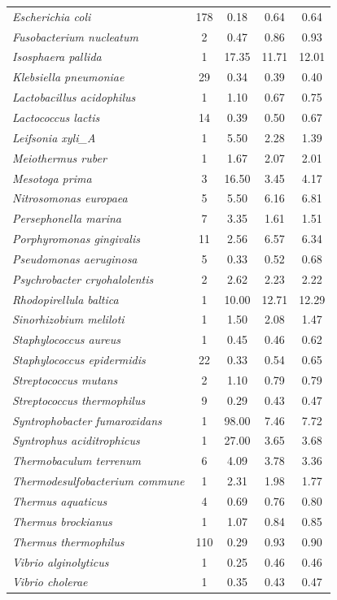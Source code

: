 \begin{longtable}{p{6.2cm}cccc}
\textit{Escherichia coli} & 178 & 0.18 & 0.64 & 0.64 \\
\textit{Fusobacterium nucleatum} & 2 & 0.47 & 0.86 & 0.93 \\
\textit{Isosphaera pallida} & 1 & 17.35 & 11.71 & 12.01 \\
\textit{Klebsiella pneumoniae} & 29 & 0.34 & 0.39 & 0.40 \\
\textit{Lactobacillus acidophilus} & 1 & 1.10 & 0.67 & 0.75 \\
\textit{Lactococcus lactis} & 14 & 0.39 & 0.50 & 0.67 \\
\textit{Leifsonia xyli\_A} & 1 & 5.50 & 2.28 & 1.39 \\
\textit{Meiothermus ruber} & 1 & 1.67 & 2.07 & 2.01 \\
\textit{Mesotoga prima} & 3 & 16.50 & 3.45 & 4.17 \\
\textit{Nitrosomonas europaea} & 5 & 5.50 & 6.16 & 6.81 \\
\textit{Persephonella marina} & 7 & 3.35 & 1.61 & 1.51 \\
\textit{Porphyromonas gingivalis} & 11 & 2.56 & 6.57 & 6.34 \\
\textit{Pseudomonas aeruginosa} & 5 & 0.33 & 0.52 & 0.68 \\
\textit{Psychrobacter cryohalolentis} & 2 & 2.62 & 2.23 & 2.22 \\
\textit{Rhodopirellula baltica} & 1 & 10.00 & 12.71 & 12.29 \\
\textit{Sinorhizobium meliloti} & 1 & 1.50 & 2.08 & 1.47 \\
\textit{Staphylococcus aureus} & 1 & 0.45 & 0.46 & 0.62 \\
\textit{Staphylococcus epidermidis} & 22 & 0.33 & 0.54 & 0.65 \\
\textit{Streptococcus mutans} & 2 & 1.10 & 0.79 & 0.79 \\
\textit{Streptococcus thermophilus} & 9 & 0.29 & 0.43 & 0.47 \\
\textit{Syntrophobacter fumaroxidans} & 1 & 98.00 & 7.46 & 7.72 \\
\textit{Syntrophus aciditrophicus} & 1 & 27.00 & 3.65 & 3.68 \\
\textit{Thermobaculum terrenum} & 6 & 4.09 & 3.78 & 3.36 \\
\textit{Thermodesulfobacterium commune} & 1 & 2.31 & 1.98 & 1.77 \\
\textit{Thermus aquaticus} & 4 & 0.69 & 0.76 & 0.80 \\
\textit{Thermus brockianus} & 1 & 1.07 & 0.84 & 0.85 \\
\textit{Thermus thermophilus} & 110 & 0.29 & 0.93 & 0.90 \\
\textit{Vibrio alginolyticus} & 1 & 0.25 & 0.46 & 0.46 \\
\textit{Vibrio cholerae} & 1 & 0.35 & 0.43 & 0.47 \\
\bottomrule
\end{longtable}
